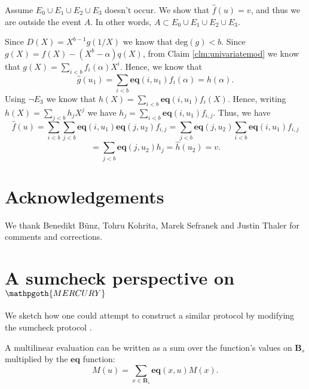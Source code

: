 \documentclass[11pt]{article} %
\newcommand{\mercury}{\ensuremath{\mathpgoth{MERCURY} }\xspace}
\renewcommand{\deg}{\ensuremath{\mathrm{deg}}\xspace}
\newcommand{\sumi}[1]{\sum_{i< #1}}
\newcommand{\sumj}[1]{\sum_{j< #1}}
\newcommand{\eq}{\ensuremath{\mathsf{eq}}\xspace}
\renewcommand{\eq}{\ensuremath{\mathbf{eq}}\xspace}
\newcommand{\mle}[1]{\ensuremath{\hat{#1}}\xspace}
\newcommand{\B}[1]{\ensuremath{\mathbf{B}_{#1}}\xspace}
\begin{document}
Assume  $E_0\cup E_1 \cup E_2\cup E_3$ doesn't occur. We show that $\mle{f}(u)=v$, and thus we are outside the event $A$.
In other words, $A\subset E_0\cup E_1 \cup E_2 \cup E_3$.


Since
$ D(X) = X^{b-1} g(1/X)$ we know that $\deg(g)<b$.
Since  $g(X) =  f(X)-(X^b-\alpha)q(X)$, from Claim \ref{clm:univariatemod} we know that
$g(X)=\sumi{b}f_i(\alpha)X^i$.
Hence, we know that 
\[\mle{g}(u_1) = \sumi{b}\eq(i,u_1) f_i(\alpha) = h(\alpha).\]
Using $\neg E_3$ we  know that
$h(X)=\sumi{b}\eq(i,u_1) f_i(X)$.
Hence, writing $h(X)=\sumj{b}h_j X^j$ we have 
$h_j= \sumi{b}\eq(i,u_1) f_{i,j}$.
Thus, we have
\[\mle{f}(u) = \sumi{b}\sumj{b}\eq(i,u_1)\eq(j,u_2) f_{i,j} = \sumj{b}\eq(j,u_2) \sumi{b}\eq(i,u_1) f_{i,j} \]
\[=\sumj{b} \eq(j,u_2) h_j = \mle{h}(u_2) = v.\]

\section*{Acknowledgements}
We thank Benedikt B{\"{u}}nz, Tohru Kohrita, Marek Sefranek and Justin Thaler for comments and corrections.


\appendix
\section{A sumcheck perspective on \mercury}\label{subsec:sumcheck}
We sketch how one could attempt to construct a similar protocol by modifying the sumcheck protocol \cite{lfkn}.

A multilinear evaluation can be written as a sum over the function's values on \B{s} multiplied by the \eq function:
$$ M(u) = \sum_{x \in \B{s}} \eq(x, u) M(x). $$
\end{document}
